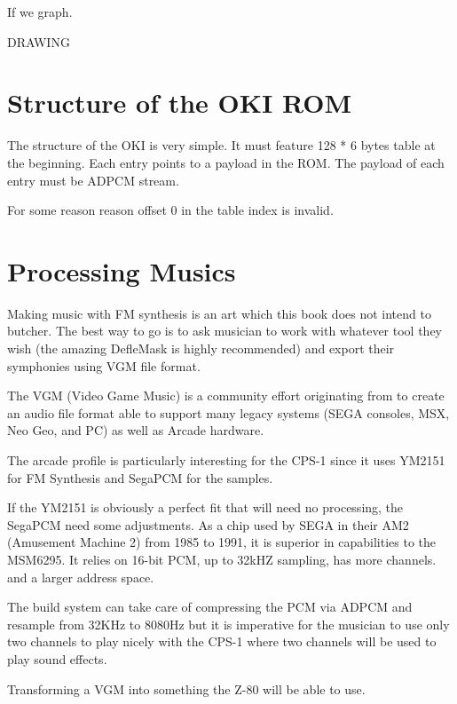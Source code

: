 If we graph.

DRAWING

\pagebreak


\section{Structure of the OKI ROM}
The structure of the OKI is very simple. It must feature 128 * 6 bytes table at the beginning. Each entry points to a payload in the ROM. The payload of each entry must be ADPCM stream.

For some reason reason offset 0 in the table index is invalid.

\pagebreak















\section{Processing Musics}
Making music with FM synthesis is an art which this book does not intend to butcher. The best way to go is to ask musician to work with whatever tool they wish (the amazing DefleMask is highly recommended) and export their symphonies using VGM file format.

The VGM (Video Game Music) is a community effort originating from  to create an audio file format able to support many legacy systems (SEGA consoles, MSX, Neo Geo, and PC) as well as Arcade hardware.

The arcade profile is particularly interesting for the CPS-1 since it uses YM2151 for FM Synthesis and SegaPCM for the samples.

If the YM2151 is obviously a perfect fit that will need no processing, the SegaPCM need some adjustments. As a chip used by SEGA in their AM2 (Amusement Machine 2) from 1985 to 1991, it is superior in capabilities to the MSM6295. It relies on 16-bit PCM, up to 32kHZ sampling, has more channels. and a larger address space.

The build system can take care of compressing the PCM via ADPCM and resample from 32KHz to 8080Hz but it is imperative for the musician to use only two channels to play nicely with the CPS-1 where two channels will be used to play sound effects.

Transforming a VGM into something the Z-80 will be able to use.
\pagebreak





